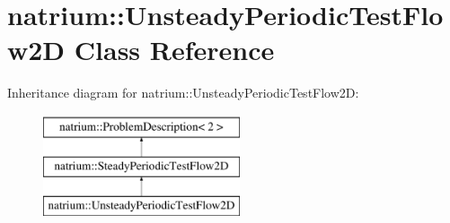 \hypertarget{classnatrium_1_1UnsteadyPeriodicTestFlow2D}{\section{natrium\-:\-:Unsteady\-Periodic\-Test\-Flow2\-D Class Reference}
\label{classnatrium_1_1UnsteadyPeriodicTestFlow2D}
}
Inheritance diagram for natrium\-:\-:Unsteady\-Periodic\-Test\-Flow2\-D\-:\begin{figure}[H]
\begin{center}
\leavevmode
\includegraphics[height=3.000000cm]{classnatrium_1_1UnsteadyPeriodicTestFlow2D}
\end{center}
\end{figure}
